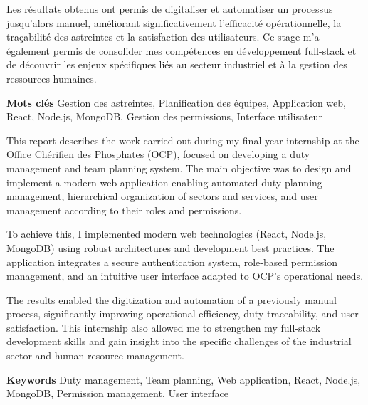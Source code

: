 \documentclass[11pt]{memoir}
\begin{document}
Les résultats obtenus ont permis de digitaliser et automatiser un processus jusqu'alors manuel, améliorant significativement l'efficacité opérationnelle, la traçabilité des astreintes et la satisfaction des utilisateurs. Ce stage m'a également permis de consolider mes compétences en développement full-stack et de découvrir les enjeux spécifiques liés au secteur industriel et à la gestion des ressources humaines.

\bigskip\newline\newline
\textbf{\color{CentraleBlue}Mots clés} Gestion des astreintes, Planification des équipes, Application web, React, Node.js, MongoDB, Gestion des permissions, Interface utilisateur

\bigskip\bigskip
This report describes the work carried out during my final year internship at the Office Chérifien des Phosphates (OCP), focused on developing a duty management and team planning system. The main objective was to design and implement a modern web application enabling automated duty planning management, hierarchical organization of sectors and services, and user management according to their roles and permissions.

To achieve this, I implemented modern web technologies (React, Node.js, MongoDB) using robust architectures and development best practices. The application integrates a secure authentication system, role-based permission management, and an intuitive user interface adapted to OCP's operational needs.

The results enabled the digitization and automation of a previously manual process, significantly improving operational efficiency, duty traceability, and user satisfaction. This internship also allowed me to strengthen my full-stack development skills and gain insight into the specific challenges of the industrial sector and human resource management.

\bigskip\newline\newline
\textbf{\color{CentraleBlue}Keywords} Duty management, Team planning, Web application, React, Node.js, MongoDB, Permission management, User interface

\newpage

\restoregeometry 

\tableofcontents

\listoffigures
\listoftables







\printglossaries

\appendix





 

\end{document}
